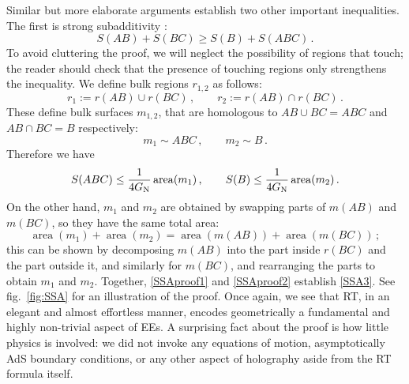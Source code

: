\documentclass[11pt]{article}
\DeclareMathOperator{\area}{area}
\begin{document}
Similar but more elaborate arguments establish two other important inequalities. The first is strong subadditivity \cite{Headrick:2007km,Headrick:2013zda}:
\begin{equation}\label{SSA3}
S(AB)+S(BC)\ge S(B)+S(ABC)\,.
\end{equation}
To avoid cluttering the proof, we will neglect the possibility of regions that touch; the reader should check that the presence of touching regions only strengthens the inequality. We define bulk regions $r_{1,2}$ as follows:
\begin{equation}
r_1 := r(AB)\cup r(BC)\,,\qquad
r_2:=r(AB)\cap r(BC)\,.
\end{equation}
These define bulk surfaces $m_{1,2}$, that are homologous to $AB\cup BC=ABC$ and $AB\cap BC=B$ respectively:
\begin{equation}
m_1\sim ABC\,,\qquad m_2\sim B\,.
\end{equation}
Therefore we have
\begin{equation}\label{SSAproof1}
S(ABC)\le\frac1{4G_{\rm N}}\area(m_1)\,,\qquad
S(B)\le\frac1{4G_{\rm N}}\area(m_2)\,.
\end{equation}
On the other hand, $m_1$ and $m_2$ are obtained by swapping parts of $m(AB)$ and $m(BC)$, so they have the same total area:
\begin{equation}\label{SSAproof2}
\area(m_1)+\area(m_2) = \area(m(AB))+\area(m(BC))\,;
\end{equation}
this can be shown by decomposing $m(AB)$ into the part inside $r(BC)$ and the part outside it, and similarly for $m(BC)$, and rearranging the parts to obtain $m_1$ and $m_2$. Together, \eqref{SSAproof1} and \eqref{SSAproof2} establish \eqref{SSA3}. See fig.\ \ref{fig:SSA} for an illustration of the proof. Once again, we see that RT, in an elegant and almost effortless manner, encodes geometrically a fundamental and highly non-trivial aspect of EEs. A surprising fact about the proof is how little physics is involved: we did not invoke any equations of motion, asymptotically AdS boundary conditions, or any other aspect of holography aside from the RT formula itself.
\end{document}
